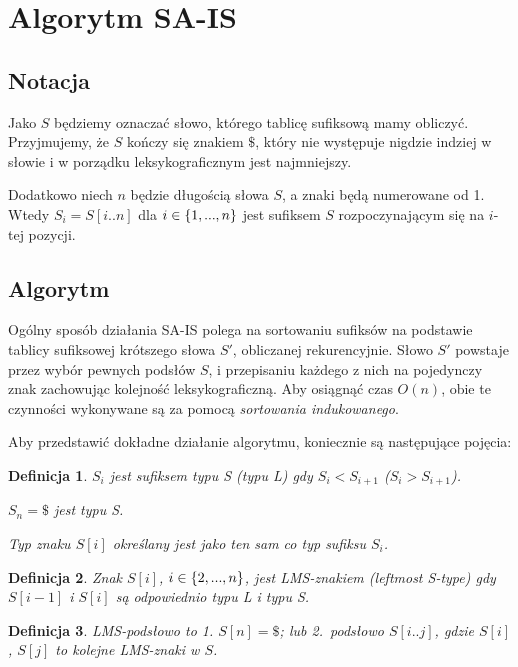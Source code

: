 \documentclass[12pt]{article}
\newtheorem{definition}{Definicja}
\newcommand{\elps}{\makebox[.8em][c]{.\hfil.\hfil.}}
\newcommand{\range}[2]{\{#1, \elps, #2\}}
\begin{document}
\section*{Algorytm SA-IS}

\subsection*{Notacja}

Jako $S$ będziemy oznaczać słowo, którego tablicę sufiksową mamy obliczyć.
Przyjmujemy, że $S$ kończy się znakiem \(\$\), który nie występuje nigdzie
indziej w słowie i w porządku leksykograficznym jest najmniejszy.

Dodatkowo niech $n$ będzie długością słowa $S$, a znaki będą numerowane od 1.
Wtedy $S_{i} = S[i..n]$ dla $i \in \range{1}{n}$ jest sufiksem $S$
rozpoczynającym się na $i$-tej pozycji.

\subsection*{Algorytm}

Ogólny sposób działania SA-IS polega na sortowaniu sufiksów na podstawie
tablicy sufiksowej krótszego słowa $S'$, obliczanej rekurencyjnie.
Słowo $S'$ powstaje przez wybór pewnych podsłów $S$, i przepisaniu każdego
z nich na pojedynczy znak zachowując kolejność leksykograficzną.
Aby osiągnąć czas $O(n)$, obie te czynności wykonywane są za pomocą
\textit{sortowania indukowanego}.

Aby przedstawić dokładne działanie algorytmu, koniecznie są następujące pojęcia:

\begin{definition}
	$S_i$ jest sufiksem typu S (typu L) gdy $S_i < S_{i+1}$ ($S_i > S_{i+1}$).

	\(S_n = \$\) jest typu S.

	Typ znaku $S[i]$ określany jest jako ten sam co typ sufiksu $S_i$.
\end{definition}

\begin{definition}
	Znak $S[i]$, $i \in \range{2}{n}$, jest LMS-znakiem (leftmost S-type) gdy
	$S[i-1]$ i $S[i]$ są odpowiednio typu L i typu S.
\end{definition}

\begin{definition}
	LMS-podsłowo to 1. \(S[n] = \$\); lub 2.\ podsłowo $S[i..j]$, gdzie
	$S[i]$, $S[j]$ to kolejne LMS-znaki w $S$.
\end{definition}
\end{document}
